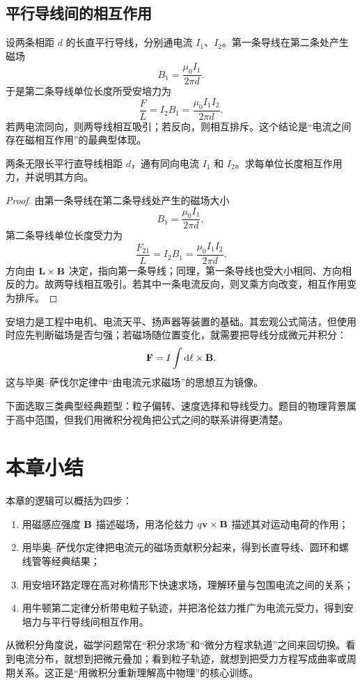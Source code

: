 \subsection*{平行导线间的相互作用}

设两条相距 $d$ 的长直平行导线，分别通电流 $I_1$、$I_2$。第一条导线在第二条处产生磁场
\[
  B_1=\frac{\mu_0 I_1}{2\pi d}.
\]
于是第二条导线单位长度所受安培力为
\[
  \frac{F}{L}=I_2B_1=\frac{\mu_0 I_1 I_2}{2\pi d}.
\]
若两电流同向，则两导线相互吸引；若反向，则相互排斥。这个结论是“电流之间存在磁相互作用”的最典型体现。

\begin{example}
两条无限长平行直导线相距 $d$，通有同向电流 $I_1$ 和 $I_2$。求每单位长度相互作用力，并说明其方向。
\end{example}

\begin{proof}
由第一条导线在第二条导线处产生的磁场大小
\[
  B_1=\frac{\mu_0 I_1}{2\pi d},
\]
第二条导线单位长度受力为
\[
  \frac{F_{21}}{L}=I_2B_1=\frac{\mu_0 I_1I_2}{2\pi d}.
\]
方向由 $\vb{L}\times\vb{B}$ 决定，指向第一条导线；同理，第一条导线也受大小相同、方向相反的力。故两导线相互吸引。若其中一条电流反向，则叉乘方向改变，相互作用变为排斥。
\end{proof}

\begin{remark}
安培力是工程中电机、电流天平、扬声器等装置的基础。其宏观公式简洁，但使用时应先判断磁场是否匀强；若磁场随位置变化，就需要把导线分成微元并积分：
\[
  \vb{F}=I\int \dd\vb{\ell}\times\vb{B}.
\]
这与毕奥--萨伐尔定律中“由电流元求磁场”的思想互为镜像。
\end{remark}

下面选取三类典型经典题型：粒子偏转、速度选择和导线受力。题目的物理背景属于高中范围，但我们用微积分视角把公式之间的联系讲得更清楚。

\section*{本章小结}

本章的逻辑可以概括为四步：
\begin{enumerate}
  \item 用磁感应强度 $\vb{B}$ 描述磁场，用洛伦兹力 $q\vb{v}\times\vb{B}$ 描述其对运动电荷的作用；
  \item 用毕奥--萨伐尔定律把电流元的磁场贡献积分起来，得到长直导线、圆环和螺线管等经典结果；
  \item 用安培环路定理在高对称情形下快速求场，理解环量与包围电流之间的关系；
  \item 用牛顿第二定律分析带电粒子轨迹，并把洛伦兹力推广为电流元受力，得到安培力与平行导线间相互作用。
\end{enumerate}

从微积分角度说，磁学问题常在“积分求场”和“微分方程求轨道”之间来回切换。看到电流分布，就想到把微元叠加；看到粒子轨迹，就想到把受力方程写成曲率或周期关系。这正是“用微积分重新理解高中物理”的核心训练。

